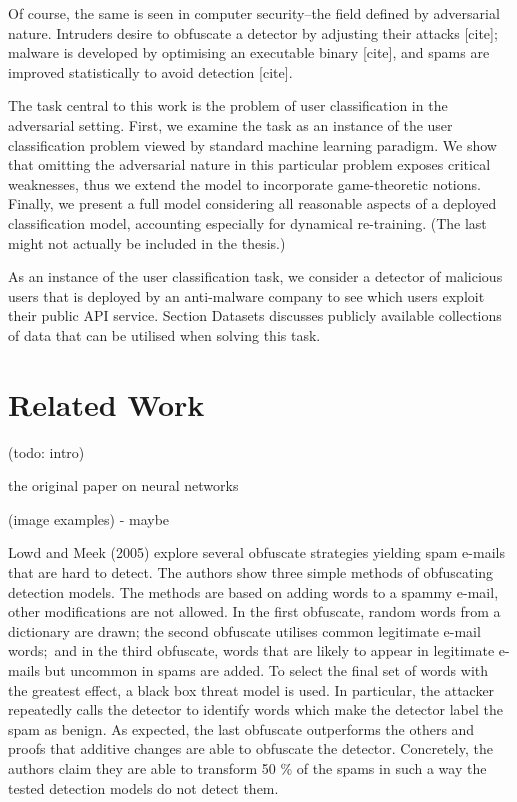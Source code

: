 \documentclass[10pt]{article}
\begin{document}
Of course, the same is seen in computer security–the field defined by
adversarial nature. Intruders desire to obfuscate a detector by
adjusting their attacks {[}cite{]}; malware is developed by optimising
an executable binary {[}cite{]}, and spams are improved statistically to
avoid detection {[}cite{]}.

The task central to this work is the problem of user classification in
the adversarial setting. First, we examine the task as an instance of
the user classification problem viewed by standard machine learning
paradigm. We show that omitting the adversarial nature in this
particular problem exposes critical weaknesses, thus we extend the model
to incorporate game-theoretic notions. Finally, we present a full model
considering all reasonable aspects of a deployed classification model,
accounting especially for dynamical re-training. (The last might not
actually be included in the thesis.)

As an instance of the user classification task, we consider a detector
of malicious users that is deployed by an anti-malware company to see
which users exploit their public API service. Section Datasets discusses
publicly available collections of data that can be utilised when solving
this task.

\section{Related Work}

(todo: intro)

the original paper on neural networks

(image examples) - maybe

Lowd and Meek (2005) explore several obfuscate strategies yielding spam
e-mails that are hard to detect. The authors show three simple methods
of obfuscating detection models. The methods are based on adding words
to a spammy e-mail, other modifications are not allowed. In the first
obfuscate, random words from a dictionary are drawn; the second obfuscate
utilises common legitimate e-mail words;~and in the third obfuscate, words
that are likely to appear in legitimate e-mails but uncommon in spams
are added. To select the final set of words with the greatest effect, a
black box threat model is used. In particular, the attacker repeatedly
calls the detector to identify words which make the detector label the
spam as benign. As expected, the last obfuscate outperforms the others and
proofs that additive changes are able to obfuscate the detector.
Concretely, the authors claim they are able to transform 50 \% of the
spams in such a way the tested detection models do not detect them.
\end{document}
